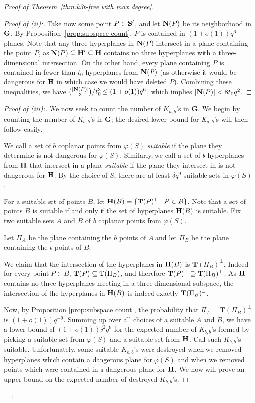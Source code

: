 \documentclass[12pt]{article}
\begin{document}
\begin{proof}[Proof of Theorem~\ref{thm:k3t-free with max degree}]
\begin{proof}[Proof of (ii):]
Take now some point $P \in \bold{S}'$, and let $\bold{N}(P)$ be its neighborhood in $\bold{G}$. By Proposition~\ref{prop:subspace count}, $P$ is contained in $(1+o(1))q^6$ planes. Note that any three hyperplanes in $\bold{N}(P)$ intersect in a plane containing the point $P$, as $\bold{N}(P) \subseteq \bold{H}'\subseteq \bold{H}$ contains no three hyperplanes with a three-dimensional intersection. On the other hand, every plane containing $P$ is contained in fewer than $t_0$ hyperplanes from $\bold{N}(P)$ (as otherwise it would be dangerous for $\bold{H}$ in which case we would have deleted $P$). Combining these inequalities, we have ${|\bold{N}(P)| \choose 3}/t_0^3\leq (1+o(1))q^6$, which implies  $|\bold{N}(P)|<8t_0q^2$.
    \end{proof}
    
\begin{proof}[Proof of (iii):] We now seek to count the number of  $K_{a, b}$'s in $\textbf{G}$. We begin by counting the number of $K_{b, b}$'s in $\textbf{G}$; the desired lower bound for $K_{a,b}$'s will then follow easily. 

We call a set of $b$ coplanar points from $\varphi(S)$ \emph{suitable} if the plane they determine is not dangerous for $\varphi(S)$. Similarly, we call a set of $b$ hyperplanes from $\bold{H}$ that intersect in a plane \emph{suitable} if the plane they intersect in is not dangerous for $\bold{H}$. By the choice of $S$, there are at least $\delta q^9$ suitable sets in $\varphi(S)$.

For a suitable set of points $B$, let  $\bold{H}(B) = \{ \textbf{T}(P)^{\perp} : P \in B\}$. Note that a set of points $B$ is suitable if and only if the set of hyperplanes $\bold{H}(B)$ is suitable. 
Fix two suitable sets $A$ and $B$ of $b$ coplanar points from $\varphi(S)$. 

Let $\Pi_A$ be the plane containing the $b$ points of $A$ and let $\Pi_B$ be the plane containing the $b$ points of $B$. 

We claim that the intersection of the hyperplanes in $\bold{H}(B)$ is $\textbf{T}(\Pi_B)^{\perp}$. Indeed for every point $P \in B$, $\bold{T}(P) \subseteq \bold{T}(\Pi_B)$, and therefore $\bold{T}(P)^{\perp} \supseteq \bold{T}(\Pi_B)^{\perp}$. As $\bold{H}$ contains no three hyperplanes meeting in a three-dimensional subspace, the intersection of the hyperplanes in $\bold{H}(B)$ is indeed exactly $\bold{T}(\Pi_B)^{\perp}$. 

Now, by Proposition \ref{prop:subspace count}, the probability that $\Pi_A = \textbf{T}(\Pi_B)^{\perp}$ is $(1 +o(1))q^{-9}$.  Summing up over all choices of a suitable $A$ and $B$, we have a lower bound of $(1+o(1))\delta^2 q^9$ for the expected number of $K_{b, b}$'s formed by picking a suitable set from $\varphi(S)$ and a suitable set from $\bold{H}$. Call such $K_{b, b}$'s suitable. 
Unfortunately, some suitable $K_{b, b}$'s were destroyed when we removed hyperplanes which contain a dangerous plane for $\varphi(S)$ and when we removed points which were contained in a dangerous plane for $\bold{H}$. We now will prove an upper bound on the expected number of destroyed $K_{b, b}$'s. 


\end{proof}
\end{proof}
\end{document}
